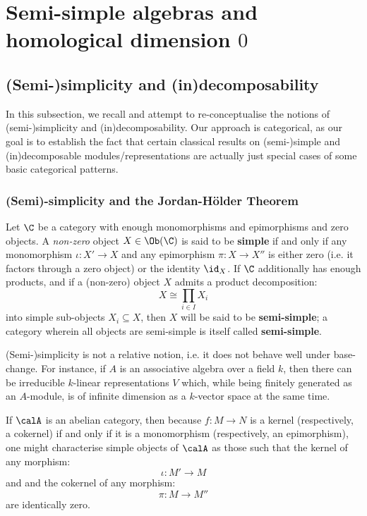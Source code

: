 \section{Semi-simple algebras and homological dimension \texorpdfstring{$0$}{}}
    \subsection{(Semi-)simplicity and (in)decomposability}
        In this subsection, we recall and attempt to re-conceptualise the notions of (semi-)simplicity and (in)decomposability. Our approach is categorical, as our goal is to establish the fact that certain classical results on (semi-)simple and (in)decomposable modules/representations are actually just special cases of some basic categorical patterns. 
    
        \subsubsection{(Semi)-simplicity and the Jordan-H\"older Theorem}
            \begin{definition} \label{def: (semi)_simple_objects}
                Let $\C$ be a category with enough monomorphisms and epimorphisms and zero objects. A \textit{non-zero} object $X \in \Ob(\C)$ is said to be \textbf{simple} if and only if any monomorphism $\iota: X' \to X$ and any epimorphism $\pi: X \to X''$ is either zero (i.e. it factors through a zero object) or the identity $\id_X$. If $\C$ additionally has enough products, and if a (non-zero) object $X$ admits a product decomposition:
                    $$X \cong \prod_{i \in I} X_i$$
                into simple sub-objects $X_i \subseteq X$, then $X$ will be said to be \textbf{semi-simple}; a category wherein all objects are semi-simple is itself called \textbf{semi-simple}.
            \end{definition}
            \begin{example}
                (Semi-)simplicity is not a relative notion, i.e. it does not behave well under base-change. For instance, if $A$ is an associative algebra over a field $k$, then there can be irreducible $k$-linear representations $V$ which, while being finitely generated as an $A$-module, is of infinite dimension as a $k$-vector space at the same time.
            \end{example}
            \begin{remark}
                If $\calA$ is an abelian category, then because $f: M \to N$ is a kernel (respectively, a cokernel) if and only if it is a monomorphism (respectively, an epimorphism), one might characterise simple objects of $\calA$ as those such that the kernel of any morphism:
                    $$\iota: M' \to M$$
                and and the cokernel of any morphism:
                    $$\pi: M \to M''$$
                are identically zero. 
            \end{remark}
